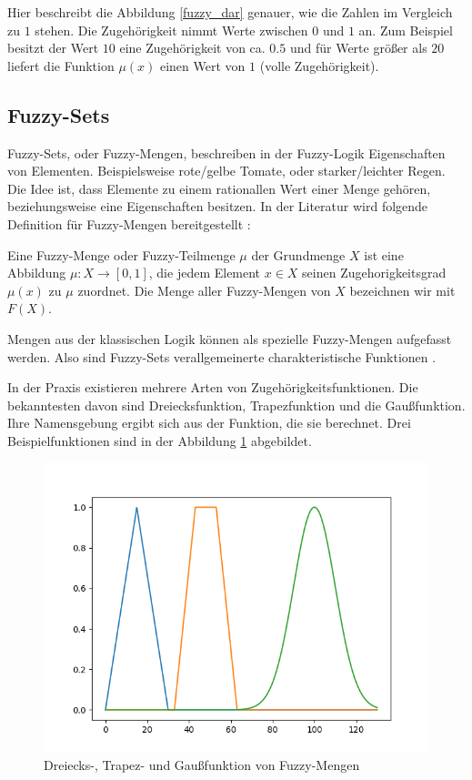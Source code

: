 Hier beschreibt die Abbildung \ref{fuzzy_dar} genauer, wie die Zahlen im Vergleich zu $1$ stehen. Die Zugehörigkeit nimmt Werte zwischen $0$ und $1$ an. Zum Beispiel besitzt der Wert $10$ eine Zugehörigkeit von ca. $0.5$ und für Werte größer als $20$ liefert die Funktion $\mu (x)$ einen Wert von $1$ (volle Zugehörigkeit).


\subsection{Fuzzy-Sets}\label{fs_section}%
Fuzzy-Sets, oder Fuzzy-Mengen, beschreiben in der Fuzzy-Logik Eigenschaften von Elementen. Beispielsweise rote/gelbe Tomate, oder starker/leichter Regen. Die Idee ist, dass Elemente zu einem rationallen Wert einer Menge gehören, beziehungsweise eine Eigenschaften besitzen. In der Literatur wird folgende Definition für Fuzzy-Mengen bereitgestellt \cite{CIKruse:15}:

\begin{definition}
	Eine Fuzzy-Menge oder Fuzzy-Teilmenge $\mu$ der Grundmenge $X$ ist eine
	Abbildung $\mu : X \rightarrow [0, 1]$, die jedem Element $x \in X$ seinen Zugehorigkeitsgrad $\mu(x)$ zu
	$\mu$ zuordnet. Die Menge aller Fuzzy-Mengen von $X$ bezeichnen wir mit $F(X)$.
\end{definition}

Mengen aus der klassischen Logik können als spezielle Fuzzy-Mengen aufgefasst werden. Also sind Fuzzy-Sets verallgemeinerte charakteristische Funktionen \cite{CIKruse:15}.

In der Praxis existieren mehrere Arten von Zugehörigkeitsfunktionen. Die bekanntesten davon sind Dreiecksfunktion, Trapezfunktion und die Gaußfunktion. Ihre Namensgebung ergibt sich aus der Funktion, die sie berechnet. Drei Beispielfunktionen sind in der Abbildung \ref{mf_types} abgebildet.

\begin{figure}[htbp]
	\centering
	\includegraphics[scale=0.5]{images/mf_types.png}
	\caption{Dreiecks-, Trapez- und Gaußfunktion von Fuzzy-Mengen}\label{mf_types}
\end{figure}

